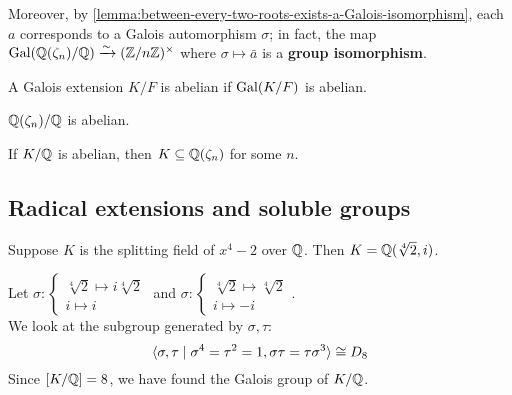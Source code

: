 \documentclass[12pt]{article}
\begin{document}
Moreover, by \cref{lemma:between-every-two-roots-exists-a-Galois-isomorphism}, each $a$ corresponds to a Galois automorphism $\sigma$; in fact, the map $\operatorname{Gal}(\mathbb{Q}(\zeta_n)/\mathbb{Q})\xrightarrow{\sim} (\mathbb{Z}/n\mathbb{Z})^\times$ where $\sigma\mapsto \bar a$ is a \textbf{group isomorphism}.

 A Galois extension $K/F$ is abelian if $\operatorname{Gal}(K/F)$ is abelian.

\begin{corollary}
    $\mathbb{Q}(\zeta_n)/\mathbb{Q}$ is abelian.
\end{corollary}

\begin{theorem}
    If $K/\mathbb{Q}$ is abelian, then $K\subseteq \mathbb{Q}(\zeta_n)$ for some $n$.
\end{theorem}

\subsection{Radical extensions and soluble groups}

\eg Suppose $K$ is the splitting field of $x^4-2$ over $\mathbb{Q}$. Then $K=\mathbb{Q}(\sqrt[4]{2},i)$.

Let 
$\sigma:\begin{cases}
    \sqrt[4]2\mapsto i\sqrt[4]2\\
    i\mapsto i
\end{cases}$ and $\sigma:\begin{cases}
    \sqrt[4]2\mapsto \sqrt[4]2\\
    i\mapsto -i
\end{cases}$. \\We look at the subgroup generated by $\sigma,\tau$: $$\langle \sigma,\tau\mid \sigma^4=\tau^2=1, \sigma\tau=\tau\sigma^3 \rangle\cong D_8$$
Since $[K/\mathbb{Q}]=8$, we have found the Galois group of $K/\mathbb{Q}$.
\end{document}

